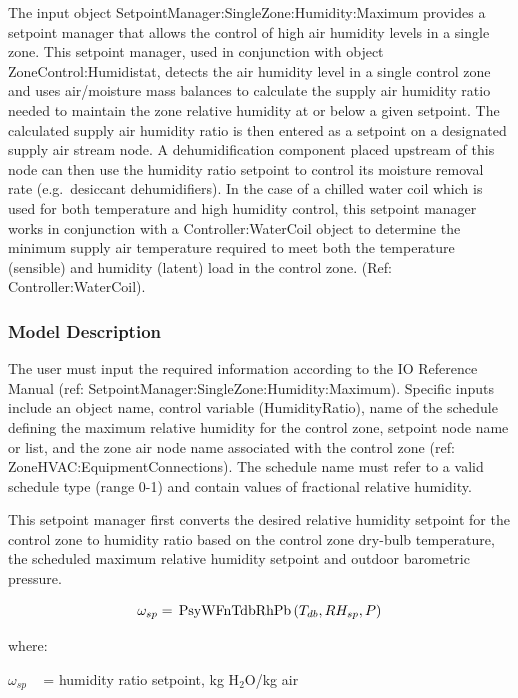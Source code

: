 The input object SetpointManager:SingleZone:Humidity:Maximum provides a setpoint manager that allows the control of high air humidity levels in a single zone. This setpoint manager, used in conjunction with object ZoneControl:Humidistat, detects the air humidity level in a single control zone and uses air/moisture mass balances to calculate the supply air humidity ratio needed to maintain the zone relative humidity at or below a given setpoint. The calculated supply air humidity ratio is then entered as a setpoint on a designated supply air stream node. A dehumidification component placed upstream of this node can then use the humidity ratio setpoint to control its moisture removal rate (e.g.~desiccant dehumidifiers). In the case of a chilled water coil which is used for both temperature and high humidity control, this setpoint manager works in conjunction with a Controller:WaterCoil object to determine the minimum supply air temperature required to meet both the temperature (sensible) and humidity (latent) load in the control zone. (Ref: Controller:WaterCoil).

\subsubsection{Model Description}\label{model-description-014}

The user must input the required information according to the IO Reference Manual (ref: SetpointManager:SingleZone:Humidity:Maximum). Specific inputs include an object name, control variable (HumidityRatio), name of the schedule defining the maximum relative humidity for the control zone, setpoint node name or list, and the zone air node name associated with the control zone (ref: ZoneHVAC:EquipmentConnections). The schedule name must refer to a valid schedule type (range 0-1) and contain values of fractional relative humidity.

This setpoint manager first converts the desired relative humidity setpoint for the control zone to humidity ratio based on the control zone dry-bulb temperature, the scheduled maximum relative humidity setpoint and outdoor barometric pressure.

\begin{equation}
{\omega_{sp}} = \,{\rm{PsyWFnTdbRhPb}}\left( {{T_{db}},R{H_{sp}},P} \right)
\end{equation}

where:

\({\omega_{sp}}\) ~ = humidity ratio setpoint, kg H\(_{2}\)O/kg air

